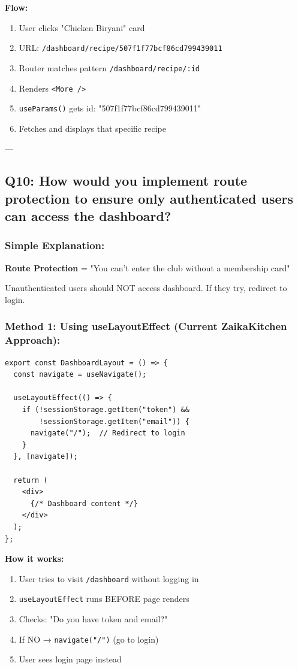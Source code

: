 \documentclass[12pt]{article}
\begin{document}
\textbf{Flow:}

\begin{enumerate}
    \item User clicks "Chicken Biryani" card
    \item URL: \texttt{/dashboard/recipe/507f1f77bcf86cd799439011}
    \item Router matches pattern \texttt{/dashboard/recipe/:id}
    \item Renders \texttt{<More />}
    \item \texttt{useParams()} gets id: "507f1f77bcf86cd799439011"
    \item Fetches and displays that specific recipe
\end{enumerate}

---

\subsection{Q10: How would you implement route protection to ensure only authenticated users can access the dashboard?}

\subsubsection*{Simple Explanation:}

\textbf{Route Protection} = "You can't enter the club without a membership card"

Unauthenticated users should NOT access dashboard. If they try, redirect to login.

\subsubsection*{Method 1: Using useLayoutEffect (Current ZaikaKitchen Approach):}

\begin{lstlisting}
export const DashboardLayout = () => {
  const navigate = useNavigate();
  
  useLayoutEffect(() => {
    if (!sessionStorage.getItem("token") && 
        !sessionStorage.getItem("email")) {
      navigate("/");  // Redirect to login
    }
  }, [navigate]);
  
  return (
    <div>
      {/* Dashboard content */}
    </div>
  );
};
\end{lstlisting}

\textbf{How it works:}

\begin{enumerate}
    \item User tries to visit \texttt{/dashboard} without logging in
    \item \texttt{useLayoutEffect} runs BEFORE page renders
    \item Checks: "Do you have token and email?"
    \item If NO → \texttt{navigate("/")} (go to login)
    \item User sees login page instead
\end{enumerate}
\end{document}
